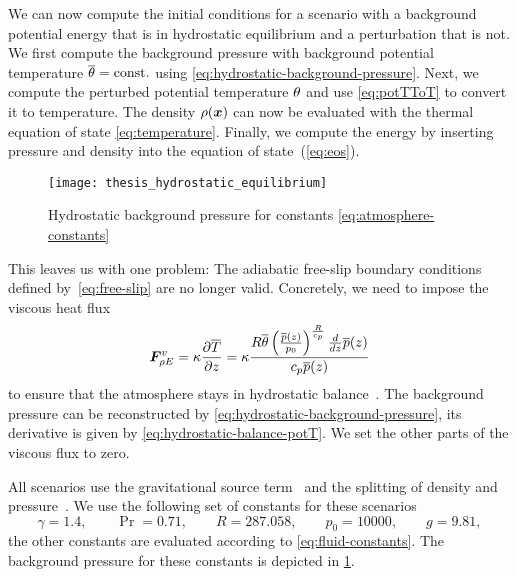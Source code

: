 We can now compute the initial conditions for a scenario with a background potential energy that is in hydrostatic equilibrium and a perturbation that is not.
We first compute the background pressure with background potential temperature $\overline{\theta} = \text{const.}$ using \cref{eq:hydrostatic-background-pressure}.
Next, we compute the perturbed potential temperature $\theta$ and use \cref{eq:potTToT} to convert it to temperature.
The density $\rho(\bm{x})$ can now be evaluated with the thermal equation of state \cref{eq:temperature}.
Finally, we compute the energy by inserting pressure and density into the equation of state~(\ref{eq:eos}).

\begin{figure}[tb]
  \centering
  \texttt{[image: thesis\_hydrostatic\_equilibrium]}
  \caption{\label{fig:hydrostatic-p}%
    Hydrostatic background pressure for constants \cref{eq:atmosphere-constants}}
\end{figure}

This leaves us with one problem:
The adiabatic free-slip boundary conditions defined by~\cref{eq:free-slip} are no longer valid.
Concretely, we need to impose the viscous heat flux
\begin{equation}
  \label{eq:atmosphere-bc}
  \bm{F}^{v}_{\rho E} = \kappa \pdv{\overline{T}}{z} =
\kappa \frac{R \overline{\theta} \left(\frac{\overline{p}{\left (z \right )}}{p_{0}}\right)^{\frac{R}{c_{p}}} \frac{d}{d z} \overline{p}{\left (z \right )}}{c_{p} \overline{p}{\left (z \right )}}
\end{equation}
to ensure that the atmosphere stays in hydrostatic balance~\cite{giraldo2008study}.
The background pressure can be reconstructed by \cref{eq:hydrostatic-background-pressure}, its derivative is given by \cref{eq:hydrostatic-balance-potT}.
We set the other parts of the viscous flux to zero.

All scenarios use the gravitational source term~ and the splitting of density and pressure~.
We use the following set of constants for these scenarios
\begin{equation}\label{eq:atmosphere-constants}
    \gamma = 1.4 ,\qquad \Pr =  0.71 ,\qquad R = 287.058 ,\qquad p_0 = 10000, \qquad g = 9.81,
\end{equation}
the other constants are evaluated according to \cref{eq:fluid-constants}.
The background pressure for these constants is depicted in \cref{fig:hydrostatic-p}.

